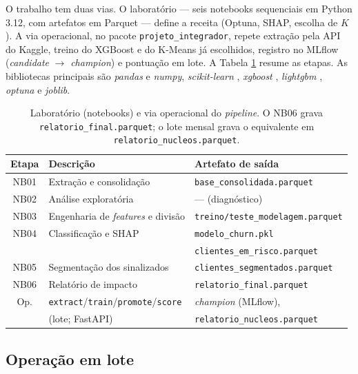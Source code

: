\documentclass[12pt]{article}
\begin{document}
O trabalho tem duas vias. O laboratório --- seis notebooks sequenciais em
Python 3.12, com artefatos em Parquet --- define a receita (Optuna, SHAP,
escolha de $K$). A via operacional, no pacote \texttt{projeto\_integrador},
repete extração pela API do Kaggle, treino do XGBoost e do K-Means já
escolhidos, registro no MLflow (\textit{candidate} $\rightarrow$
\textit{champion}) e pontuação em lote. A Tabela \ref{tab:pipeline} resume
as etapas. As bibliotecas principais são \textit{pandas} e \textit{numpy},
\textit{scikit-learn} \cite{pedregosa2011}, \textit{xgboost} \cite{chen2016},
\textit{lightgbm} \cite{ke2017}, \textit{optuna} \cite{akiba2019} e
\textit{joblib}.

\begin{table}[ht]
\centering
\caption{Laboratório (notebooks) e via operacional do \textit{pipeline}.
O NB06 grava \texttt{relatorio\_final.parquet}; o lote mensal grava o
equivalente em \texttt{relatorio\_nucleos.parquet}.}
\label{tab:pipeline}
\small
\begin{tabular}{|c|l|l|}
\hline
\textbf{Etapa} & \textbf{Descrição} & \textbf{Artefato de saída} \\
\hline
NB01 & Extração e consolidação      & \texttt{base\_consolidada.parquet} \\ \hline
NB02 & Análise exploratória         & --- (diagnóstico) \\ \hline
NB03 & Engenharia de \textit{features} e divisão & \texttt{treino/teste\_modelagem.parquet} \\ \hline
NB04 & Classificação e SHAP         & \texttt{modelo\_churn.pkl} \\
     &                              & \texttt{clientes\_em\_risco.parquet} \\ \hline
NB05 & Segmentação dos sinalizados  & \texttt{clientes\_segmentados.parquet} \\ \hline
NB06 & Relatório de impacto         & \texttt{relatorio\_final.parquet} \\ \hline
Op.  & \texttt{extract}/\texttt{train}/\texttt{promote}/\texttt{score} & \textit{champion} (MLflow), \\
     & (lote; FastAPI)               & \texttt{relatorio\_nucleos.parquet} \\
\hline
\end{tabular}
\end{table}

\subsection{Operação em lote}
\label{sub:mlops}
\end{document}
